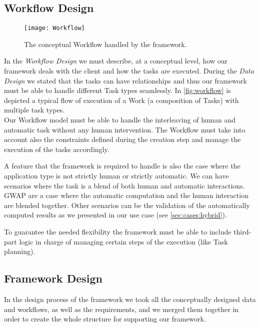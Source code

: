 \subsection{Workflow Design}\label{design:work}
\begin{figure}[htb]
    \centering
    \texttt{[image: Workflow]}
    \caption{The conceptual Workflow handled by the framework.}
    \label{fig:workflow}
\end{figure}

In the \emph{Workflow Design} we must describe, at a conceptual level, how our
framework deals with the client and how the tasks are executed. During the
\emph{Data Design} we stated that the tasks can have relationships and thus our
framework must be able to handle different Task types seamlessly. In
\autoref{fig:workflow} is depicted a typical flow of execution of a Work (a
composition of Tasks) with multiple task types.\\

Our Workflow model must be able to handle the interleaving of human and automatic
task without any human intervention. The Workflow must take into account also the
constraints defined during the creation step and manage the execution of the
tasks accordingly.

A feature that the framework is required to handle is also the case where
the application type is not strictly human or strictly automatic. We can have
scenarios where the task is a blend of both human and automatic interactions.
\ac{GWAP} are a case where the automatic computation and the human interaction
are blended together. Other scenarios can be the validation of the automatically
computed results as we presented in our use case (see \ref{sec:cases:hybrid}).

To guarantee the needed flexibility the framework must be able to include third-part
logic in charge of managing certain steps of the execution (like Task planning).




\subsection{Framework Design}
In the design process of the framework we took all the conceptually designed data
and workflows, as well as the requirements, and we merged them together in order
to create the whole structure for supporting our framework.\\

